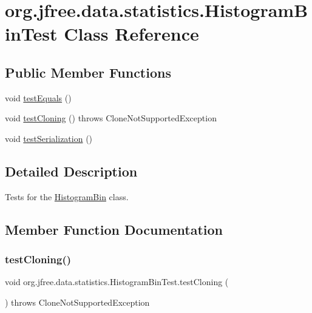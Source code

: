 \hypertarget{classorg_1_1jfree_1_1data_1_1statistics_1_1_histogram_bin_test}{}\section{org.\+jfree.\+data.\+statistics.\+Histogram\+Bin\+Test Class Reference}
\label{classorg_1_1jfree_1_1data_1_1statistics_1_1_histogram_bin_test}
\subsection*{Public Member Functions}
\begin{DoxyCompactItemize}
\item 
void \mbox{\hyperlink{classorg_1_1jfree_1_1data_1_1statistics_1_1_histogram_bin_test_a7e1f6bc9d64455a2db7a6c4457c7e6cb}{test\+Equals}} ()
\item 
void \mbox{\hyperlink{classorg_1_1jfree_1_1data_1_1statistics_1_1_histogram_bin_test_a2dc35c95d8971a5a6c6dd8183d3d618e}{test\+Cloning}} ()  throws Clone\+Not\+Supported\+Exception 
\item 
void \mbox{\hyperlink{classorg_1_1jfree_1_1data_1_1statistics_1_1_histogram_bin_test_a0f312d6d8e7cc1f5b3af86bf56d4ad75}{test\+Serialization}} ()
\end{DoxyCompactItemize}


\subsection{Detailed Description}
Tests for the \mbox{\hyperlink{classorg_1_1jfree_1_1data_1_1statistics_1_1_histogram_bin}{Histogram\+Bin}} class. 

\subsection{Member Function Documentation}
\mbox{\label{classorg_1_1jfree_1_1data_1_1statistics_1_1_histogram_bin_test_a2dc35c95d8971a5a6c6dd8183d3d618e}} 
\subsubsection{\texorpdfstring{test\+Cloning()}{testCloning()}}
{\footnotesize\ttfamily void org.\+jfree.\+data.\+statistics.\+Histogram\+Bin\+Test.\+test\+Cloning (\begin{DoxyParamCaption}{ }\end{DoxyParamCaption}) throws Clone\+Not\+Supported\+Exception}

